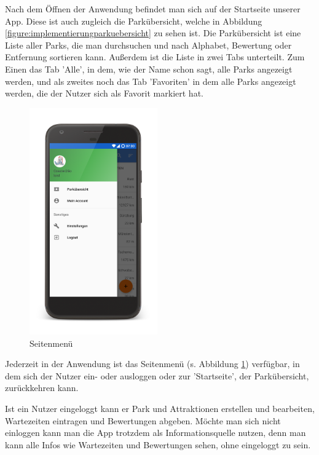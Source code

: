 Nach dem Öffnen der Anwendung befindet man sich auf der Startseite unserer App. Diese ist auch zugleich die Parkübersicht, welche in Abbildung \ref{figure:implementierungparkuebersicht} zu sehen ist. Die Parkübersicht ist eine Liste aller Parks, die man durchsuchen und nach Alphabet, Bewertung oder Entfernung sortieren kann. Außerdem ist die Liste in zwei Tabs unterteilt. Zum Einen das Tab 'Alle', in dem, wie der Name schon sagt, alle Parks angezeigt werden, und als zweites noch das Tab 'Favoriten' in dem alle Parks angezeigt werden, die der Nutzer sich als Favorit markiert hat. 

\begin{figure}[h]
    \centering
    \begin{minipage}{0.49\textwidth}
        \centering
        \includegraphics[width=0.49\textwidth, trim=150 200 200 200, 
        clip]{img/screenshots/ss_sidebar_menu.png}
        \caption{Seitenmenü}
		\label{figure:implementierungsidebar}
    \end{minipage}
\end{figure}

Jederzeit in der Anwendung ist das Seitenmenü (s. Abbildung \ref{figure:implementierungsidebar}) verfügbar, in dem sich der Nutzer ein- oder ausloggen oder zur 'Startseite', der Parkübersicht, zurückkehren kann.

Ist ein Nutzer eingeloggt kann er Park und Attraktionen erstellen und bearbeiten, Wartezeiten eintragen und Bewertungen abgeben. Möchte man sich nicht einloggen kann man die App trotzdem als Informationsquelle nutzen, denn man kann alle Infos wie Wartezeiten und Bewertungen sehen, ohne eingeloggt zu sein. 

